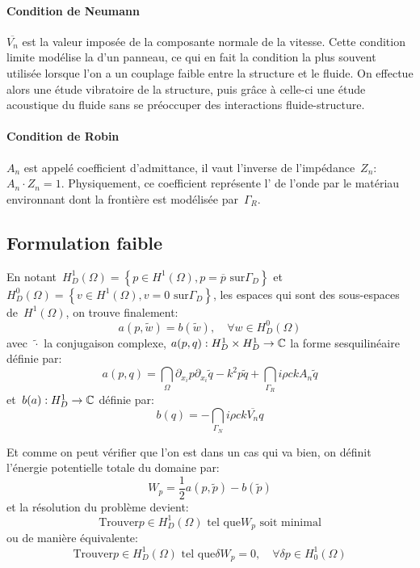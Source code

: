 \paragraph{Condition de Neumann}
$\overline{V_n}$ est la valeur imposée de la composante normale de la vitesse.
Cette condition limite modélise la  d'un panneau, ce qui en fait la condition la
plus souvent utilisée lorsque l'on a un couplage faible entre la structure et le fluide.
On effectue alors une étude vibratoire de la structure, puis grâce à celle-ci une
étude acoustique du fluide sans se préoccuper des interactions fluide-structure.

\medskip
\paragraph{Condition de Robin}
$A_n$ est appelé coefficient d'admittance, il vaut l'inverse de l'impédance~$Z_n$:
$A_n\cdot Z_n=1$.
Physiquement, ce coefficient représente l' de l'onde par le matériau environnant
dont la frontière est modélisée par~$\Gamma_R$.

\medskip
\subsection{Formulation faible}
En notant~$H^1_D(\Omega)=\left\{p\in H^1(\Omega), p=\overline{p} \text{ sur} \Gamma_D\right\}$ et
$H^0_D(\Omega)=\left\{v\in H^1(\Omega), v=0 \text{ sur} \Gamma_D\right\}$, les espaces qui sont
des sous-espaces de~$H^1(\Omega)$, on trouve finalement:
\begin{equation}a(p,\tilde{w})=b(\tilde{w}), \quad \forall w\in H^0_D(\Omega)\end{equation}
avec~$\tilde{\cdot}$ la conjugaison complexe, $a(p,q): H^1_D\times H^1_D \rightarrow \mathbb C$ la forme
sesquilinéaire définie par:
\begin{equation}a(p,q)=\dint_\Omega \partial_{x_i}p\partial_{x_i}\tilde{q}-k^2p\tilde{q} +
\dint_{\Gamma_R} i\rho ckA_n\tilde{q}
\end{equation}
et~$b(a): H^1_D\rightarrow\mathbb C$ définie par:
\begin{equation}b(q)=-\dint_{\Gamma_N} i\rho c k\overline{V_n} q\end{equation}

\medskip
Et comme on peut vérifier que l'on est dans un cas qui va bien, on définit l'énergie
potentielle totale du domaine par:
\begin{equation}W_p=\frac12 a(p,\tilde{p})-b(\tilde{p})\end{equation}
et la résolution du problème devient:
\begin{equation}
\text{Trouver} p\in H^1_D(\Omega) \text{ tel que} W_p \text{ soit minimal}
\end{equation}
ou de manière équivalente:
\begin{equation}
\text{Trouver} p\in H^1_D(\Omega) \text{ tel que} \delta W_p=0,\quad \forall\delta p\in H^1_0(\Omega)
\end{equation} 